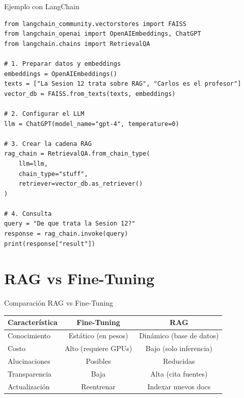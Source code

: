 \documentclass[aspectratio=169, 10pt, xcolor=table]{beamer}
\begin{document}
\begin{frame}[fragile]{Ejemplo con LangChain}
    \begin{lstlisting}
from langchain_community.vectorstores import FAISS
from langchain_openai import OpenAIEmbeddings, ChatGPT
from langchain.chains import RetrievalQA

# 1. Preparar datos y embeddings
embeddings = OpenAIEmbeddings()
texts = ["La Sesion 12 trata sobre RAG", "Carlos es el profesor"]
vector_db = FAISS.from_texts(texts, embeddings)

# 2. Configurar el LLM
llm = ChatGPT(model_name="gpt-4", temperature=0)

# 3. Crear la cadena RAG
rag_chain = RetrievalQA.from_chain_type(
    llm=llm,
    chain_type="stuff",
    retriever=vector_db.as_retriever()
)

# 4. Consulta
query = "De que trata la Sesion 12?"
response = rag_chain.invoke(query)
print(response["result"])
    \end{lstlisting}
\end{frame}

\section{RAG vs Fine-Tuning}

\begin{frame}{Comparaci\'on RAG vs Fine-Tuning}
    \begin{table}
        \centering
        \begin{tabular}{l|c|c}
            \toprule
            \textbf{Caracter\'istica} & \textbf{Fine-Tuning} & \textbf{RAG} \\
            \midrule
            Conocimiento & Est\'atico (en pesos) & Din\'amico (base de datos) \\
            Costo & Alto (requiere GPUs) & Bajo (solo inferencia) \\
            Alucinaciones & Posibles & Reducidas \\
            Transparencia & Baja & Alta (cita fuentes) \\
            Actualizaci\'on & Reentrenar & Indexar nuevos docs \\
            \bottomrule
        \end{tabular}
    \end{table}
\end{frame}
\end{document}
